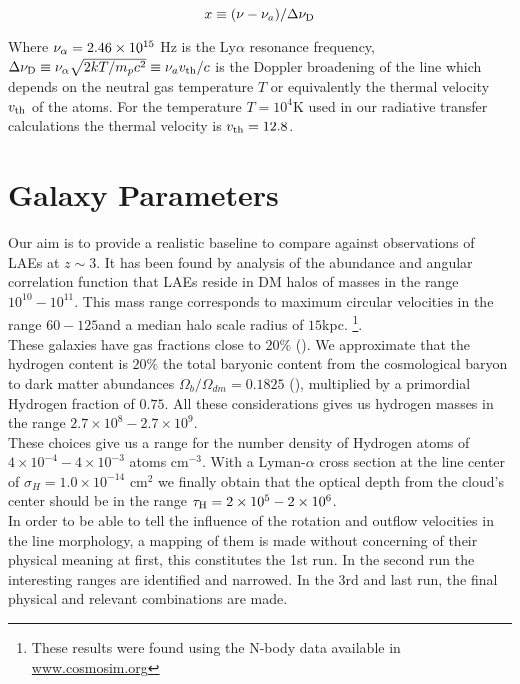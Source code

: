 \begin{equation}
x\equiv (\nu -\nu_a)/\Delta\nu_{\rm D}
\end{equation} 

Where $\nu_{\rm \alpha}=2.46\times 10^{15}$ Hz is the Ly$\alpha$ resonance frequency,  $\Delta\nu_{\rm D} \equiv \nu_{\alpha}\sqrt{2kT/m_pc^2}\equiv \nu_av_{\rm th}/c $ is the Doppler broadening of the line which depends on the neutral gas temperature $T$ or equivalently the thermal velocity $v_{\rm th}$ of the atoms. For the temperature $T=10^4$K used in our radiative transfer calculations the thermal velocity is $v_{\rm th}=12.8$\kms.   \\

\section{Galaxy Parameters}

Our aim is to provide a realistic baseline to compare against observations of LAEs at $z\sim 3$. It has been found by analysis of the abundance and angular correlation function that LAEs reside in DM halos of masses in the range $10^{10}-10^{11}$\Msun \cite{WalkerSoler2012}. This mass range corresponds to maximum circular velocities in the range $60-125$\kms and a median halo scale radius of $15$kpc. \footnote{These results were found using the  N-body data available in \url{www.cosmosim.org}}. \\

These galaxies have gas fractions close to $20\%$ (\cite{Narayanan2012}). We approximate that the hydrogen content is $20\%$ the total baryonic content from the cosmological baryon to dark matter  abundances $\Omega_b/\Omega_{dm}=0.1825$ (\cite{Planck2015}), multiplied by a primordial Hydrogen fraction of $0.75$. All these considerations gives us hydrogen masses in the range $2.7\times 10^{8}-2.7\times 10^{9}$\Msun.\\

These choices give us a range for the number density of Hydrogen atoms of $4\times10^{-4}-4\times 10^{-3}$ atoms cm$^{-3}$. With a Lyman-$\alpha$ cross section at the line center of $\sigma_{H}=1.0\times 10^{-14}$ cm$^{2}$ we finally obtain that the optical depth from the cloud's center  should be in the range $\tau_{\rm H}=2 \times 10^{5} - 2 \times 10^{6}$.  \\

In order to be able to tell the influence of the rotation and outflow velocities in the \lya line morphology, a mapping of them is made without concerning of their physical meaning at first, this constitutes the 1st run. In the second run the interesting ranges are identified and narrowed. In the 3rd and last run, the final physical and relevant combinations are made. \\

